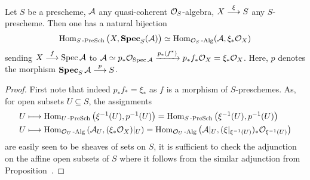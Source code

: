 \documentclass[a4paper,parskip=half,numbers=enddot, DIV=12]{scrreprt}
\begin{document}
\begin{prop}
    Let $S$ be a prescheme, $\mathcal{A}$ any quasi-coherent $\mathcal{O}_S$-algebra, $X\morphism[\xi] S$ any $S$-prescheme. Then one has a natural bijection
    \begin{align}\lbl{eq:SPECAdjunction}
        \Hom_{S\cat{-PreSch}} \big(X, \SPEC_S(\Aa)\big) \simeq \Hom_{\Oo_S\cat{-Alg}} (\Aa, \xi_* \Oo_X)
    \end{align}
    sending $X\morphism[f] \Spec \Aa$ to $\mathcal{A} \simeq p_* \mathcal{O}_{\operatorname{Spec} \mathcal{A}} \xrightarrow{p_*(f^*)} p_*f_* \mathcal{O}_X = \xi_* \mathcal{O}_X$. Here, $p$ denotes the morphism $\SPEC_S \Aa \morphism[p] S$.
\end{prop}
\begin{proof}
    First note that indeed $p_*f_*=\xi_*$ as $f$ is a morphism of $S$-preschemes. As, for open subsets $U\subseteq S$, the assignments
    \begin{align*}
        U&\longmapsto \operatorname{Hom}_{U\operatorname{-PreSch}} \left(\xi^{-1}(U), p^{-1}(U)\right) = \operatorname{Hom}_{S\operatorname{-PreSch}}\left(\xi^{-1}(U), p^{-1}(U)\right)\\
        U&\longmapsto \operatorname{Hom}_{\mathcal{O}_U\operatorname{-Alg}} \left(\mathcal{A}_U, (\xi_*\mathcal{O}_X)|_U\right) = \operatorname{Hom}_{\mathcal{O}_U\operatorname{-Alg}}\left(\mathcal{A}|_U, (\xi|_{\xi^{-1}(U)})_* \mathcal{O}_{\xi^{-1}(U)}\right)
    \end{align*}
    are easily seen to be sheaves of sets on $S$, it is sufficient to check the adjunction on the affine open subsets of $S$ where it follows from the similar adjunction from Proposition~.
\end{proof}
\end{document}
